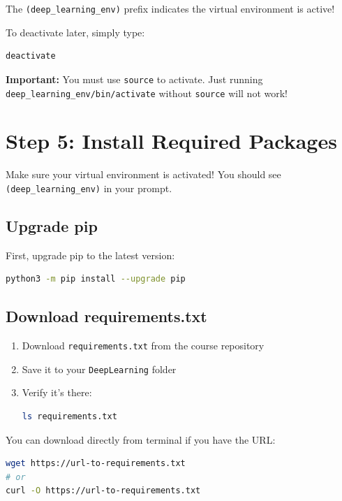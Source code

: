 \documentclass[11pt,a4paper]{article}
\begin{document}
The \texttt{(deep\_learning\_env)} prefix indicates the virtual environment is active!

\begin{tipbox}
To deactivate later, simply type:
\begin{lstlisting}[language=bash]
deactivate
\end{lstlisting}
\end{tipbox}

\begin{warningbox}
\textbf{Important:} You must use \texttt{source} to activate. Just running \texttt{deep\_learning\_env/bin/activate} without \texttt{source} will not work!
\end{warningbox}

\section{Step 5: Install Required Packages}

\begin{warningbox}
Make sure your virtual environment is activated! You should see \texttt{(deep\_learning\_env)} in your prompt.
\end{warningbox}

\subsection{Upgrade pip}

First, upgrade pip to the latest version:
\begin{lstlisting}[language=bash]
python3 -m pip install --upgrade pip
\end{lstlisting}

\subsection{Download requirements.txt}

\begin{enumerate}
    \item Download \texttt{requirements.txt} from the course repository
    \item Save it to your \texttt{DeepLearning} folder
    \item Verify it's there:
    \begin{lstlisting}[language=bash]
ls requirements.txt
    \end{lstlisting}
\end{enumerate}

\begin{tipbox}
You can download directly from terminal if you have the URL:
\begin{lstlisting}[language=bash]
wget https://url-to-requirements.txt
# or
curl -O https://url-to-requirements.txt
\end{lstlisting}
\end{tipbox}
\end{document}
